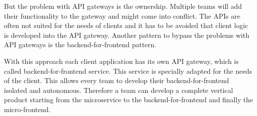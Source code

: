 But the problem with API gateways is the ownership. Multiple teams will add their functionality to the gateway and might come into conflict. The APIs are often not suited for the needs of clients and it has to be avoided that client logic is developed into the API gateway. Another pattern to bypass the problems with API gateways is the backend-for-frontend pattern. \cite{book:2018:richardson:background:bff:microservices-patterns}

With this approach each client application has its own API gateway, which is called backend-for-frontend service. This service is specially adapted for the needs of the client. \cite{book:2018:richardson:background:bff:microservices-patterns} \cite{book:2021:newman:background:bff:micro-services} This allows every team to develop their backend-for-frontend isolated and autonomous. Therefore a team can develop a complete vertical product starting from the microservice to the backend-for-frontend and finally the micro-frontend. \cite{book:2020:geers:background:micro-frontends:micro-frontends-in-action}

